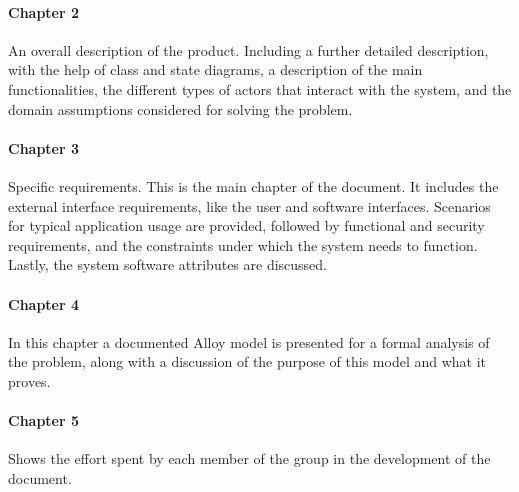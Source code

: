 \paragraph{Chapter 2} An overall description of the product. Including a further detailed description, with the help of class and state diagrams, a description of the main functionalities, the different types of actors that interact with the system, and the domain assumptions considered for solving the problem.

\paragraph{Chapter 3} Specific requirements. This is the main chapter of the document. It includes the external interface requirements, like the user and software interfaces. Scenarios for typical application usage are provided, followed by functional and security requirements, and the constraints under which the system needs to function. Lastly, the system software attributes are discussed.

\paragraph{Chapter 4} In this chapter a documented Alloy model is presented for a formal analysis of the problem, along with a discussion of the purpose of this model and what it proves.

\paragraph{Chapter 5} Shows the effort spent by each member of the group in the development of the document.
